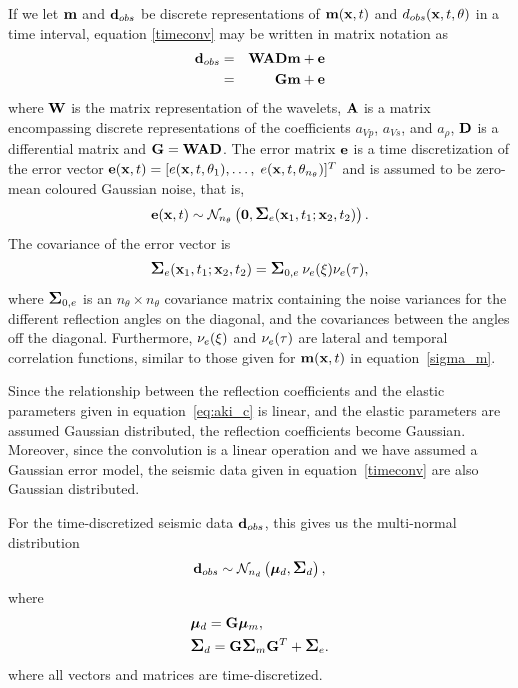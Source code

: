 If we let $\mathbf{m}$ and $\mathbf{d}_{obs}$ be discrete representations
of $\mathbf{m}(\mathbf{x},t)$ and $d_{obs}(\mathbf{x},t,\theta)$ in a time
interval, equation \eqref{timeconv} may be written in matrix
notation as
%
\begin{eqnarray}
  \mathbf{d}_{obs} & = & \mathbf{W}\mathbf{A}\mathbf{D}\mathbf{m} + \mathbf{e} \label{eq:WADm}\\
  & = & \mathbf{G}\mathbf{m} + \mathbf{e} \label{eq:Gm}
\end{eqnarray}
%
\noindent
where $\mathbf{W}$ is the matrix representation of the wavelets, $\mathbf{A}$ is
a matrix encompassing discrete representations of the coefficients $a_{Vp}$,
$a_{V\!s}$, and $a_\rho$, $\mathbf{D}$ is a differential matrix and
$\mathbf{G} = \mathbf{W}\mathbf{A}\mathbf{D}$. The
error matrix $\mathbf{e}$ is a time discretization of the error vector
$\mathbf{e}(\mathbf{x},t) = [e(\mathbf{x},t,\theta_1),\ldots,$
$e(\mathbf{x},t,\theta_{n_{\theta}})]^T$ and is assumed to be zero-mean
coloured Gaussian noise, that is,
%
\begin{equation}
  \mathbf{e}(\mathbf{x},t)
    \sim \mathcal{N}_{n_\theta}\left(\mathbf{0},
               \mbox{\large\ensuremath{\boldsymbol{\Sigma}}}_e(\mathbf{x}_1,t_1;\mathbf{x}_2,t_2)\right).
\label{edist}
\end{equation}
%
The covariance of the error vector is
%
\begin{equation}
  \mbox{\large\ensuremath{\boldsymbol{\Sigma}}}_e(\mathbf{x}_1,t_1;\mathbf{x}_2,t_2)
    = \mbox{\large\ensuremath{\boldsymbol{\Sigma}}}_{0,e} \: \nu_e(\xi) \nu_e(\tau), \label{sigma_e}
\end{equation}
%
where $\mbox{\large\ensuremath{\boldsymbol{\Sigma}}}_{0,e}$ is an $n_{\theta}\times n_{\theta}$
covariance matrix containing the noise variances for the different
reflection angles on the diagonal, and the covariances between the
angles off the diagonal. Furthermore, $\nu_e(\xi)$ and $\nu_e(\tau)$
are lateral and temporal correlation functions, similar to those
given for $\mathbf{m}(\mathbf{x},t)$ in equation~\eqref{sigma_m}.

Since the relationship between the reflection coefficients and the
elastic parameters given in equation~\eqref{eq:aki_c} is linear, and
the elastic parameters are assumed Gaussian distributed, the
reflection coefficients become Gaussian. Moreover, since the
convolution is a linear operation and we have assumed a Gaussian error
model, the seismic data given in equation~\eqref{timeconv} are also
Gaussian distributed.

For the time-discretized seismic data $\mathbf{d}_{obs}$, this gives us
the multi-normal distribution
%
\begin{equation}
  \mathbf{d}_{obs} \sim
    \mathcal{N}_{n_d}\left(\bm\mu_d,\mbox{\large\ensuremath{\boldsymbol{\Sigma}}}_d\right),
\label{ddist}
\end{equation}
%
where
%
\begin{align}
  &\bm\mu_d = \mathbf{G}\bm\mu_{m},\\
  &\mbox{\large\ensuremath{\boldsymbol{\Sigma}}}_d = \mathbf{G}\mbox{\large\ensuremath{\boldsymbol{\Sigma}}}_{m}\mathbf{G}^T + \mbox{\large\ensuremath{\boldsymbol{\Sigma}}}_e.
\end{align}
%
where all vectors and matrices are time-discretized.

